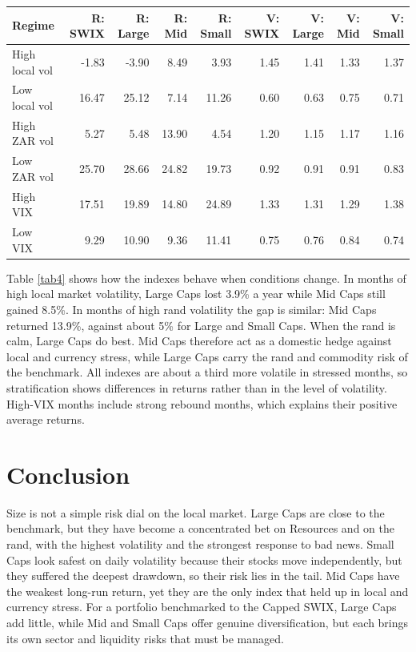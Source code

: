 \documentclass[11pt,preprint]{elsarticle}
\let\origtable\table
\let\endorigtable\endtable
\renewenvironment{table}[1][2] {
    \expandafter\origtable\expandafter[H]
} {
    \endorigtable
}
\numberwithin{equation}{section}
\numberwithin{figure}{section}
\numberwithin{table}{section}
\begin{document}
\begin{table}[H]
\centering
\caption{Annualised return (R, \%) and volatility relative to the full sample (V), by regime \label{tab4}} 
\begingroup\scriptsize
\begin{tabular}{lrrrrrrrr}
  \hline
Regime & R: SWIX & R: Large & R: Mid & R: Small & V: SWIX & V: Large & V: Mid & V: Small \\ 
  \hline
High local vol & -1.83 & -3.90 & 8.49 & 3.93 & 1.45 & 1.41 & 1.33 & 1.37 \\ 
  Low local vol & 16.47 & 25.12 & 7.14 & 11.26 & 0.60 & 0.63 & 0.75 & 0.71 \\ 
  High ZAR vol & 5.27 & 5.48 & 13.90 & 4.54 & 1.20 & 1.15 & 1.17 & 1.16 \\ 
  Low ZAR vol & 25.70 & 28.66 & 24.82 & 19.73 & 0.92 & 0.91 & 0.91 & 0.83 \\ 
  High VIX & 17.51 & 19.89 & 14.80 & 24.89 & 1.33 & 1.31 & 1.29 & 1.38 \\ 
  Low VIX & 9.29 & 10.90 & 9.36 & 11.41 & 0.75 & 0.76 & 0.84 & 0.74 \\ 
   \hline
\end{tabular}
\endgroup
\end{table}

Table \ref{tab4} shows how the indexes behave when conditions change. In
months of high local market volatility, Large Caps lost 3.9\% a year
while Mid Caps still gained 8.5\%. In months of high rand volatility the
gap is similar: Mid Caps returned 13.9\%, against about 5\% for Large
and Small Caps. When the rand is calm, Large Caps do best. Mid Caps
therefore act as a domestic hedge against local and currency stress,
while Large Caps carry the rand and commodity risk of the benchmark. All
indexes are about a third more volatile in stressed months, so
stratification shows differences in returns rather than in the level of
volatility. High-VIX months include strong rebound months, which
explains their positive average returns.

\section{\texorpdfstring{Conclusion
\label{Conclusion}}{Conclusion }}\label{conclusion}

Size is not a simple risk dial on the local market. Large Caps are close
to the benchmark, but they have become a concentrated bet on Resources
and on the rand, with the highest volatility and the strongest response
to bad news. Small Caps look safest on daily volatility because their
stocks move independently, but they suffered the deepest drawdown, so
their risk lies in the tail. Mid Caps have the weakest long-run return,
yet they are the only index that held up in local and currency stress.
For a portfolio benchmarked to the Capped SWIX, Large Caps add little,
while Mid and Small Caps offer genuine diversification, but each brings
its own sector and liquidity risks that must be managed.
\end{document}
